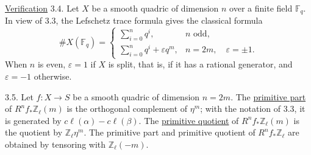 
\underline{Verification} 3.4. Let $X$ be a smooth quadric of dimension
$n$ over a finite field $\mathbb F_q$.  In view of 3.3, the Lefschetz
trace formula gives the classical formula
\begin{equation*}
\#X(\mathbb F_q)=
\begin{cases}
\displaystyle\sum_{i=0}^{n}q^i,
  & n\text{ odd},\\[2ex]
\displaystyle\sum_{i=0}^{n}q^i+\varepsilon q^m,
  & n=2m,\quad \varepsilon=\pm1.
\end{cases}
\end{equation*}
When $n$ is even, $\varepsilon=1$ if $X$ is split, that is, if it has a
rational generator, and $\varepsilon=-1$ otherwise.

3.5. Let $f:X\longrightarrow S$ be a smooth quadric of dimension
$n=2m$.  The \underline{primitive part} of
$R^nf_*\mathbb Z_\ell(m)$ is the orthogonal complement of $\eta^m$;
with the notation of 3.3, it is generated by
$c\ell(\alpha)-c\ell(\beta)$.  The \underline{primitive quotient} of
$R^nf_*\mathbb Z_\ell(m)$ is the quotient by
$\mathbb Z_\ell\eta^m$.  The primitive part and primitive quotient of
$R^nf_*\mathbb Z_\ell$ are obtained by tensoring with
$\mathbb Z_\ell(-m)$.

